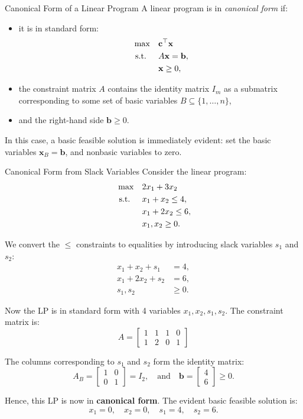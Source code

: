 \begin{definition}{Canonical Form of a Linear Program}\label{def:canonical-form}
A linear program is in \emph{canonical form} if:
\begin{itemize}
    \item it is in standard form:
    \[
    \begin{aligned}
    \max \quad & \mathbf{c}^\top \mathbf{x} \\
    \text{ s.t. } \quad & A \mathbf{x} = \mathbf{b}, \\
    & \mathbf{x} \geq 0,
    \end{aligned}
    \]
    \item the constraint matrix \( A \) contains the identity matrix \( I_m \) as a submatrix corresponding to some set of basic variables \( B \subseteq \{1, \dots, n\} \),
    \item and the right-hand side \( \mathbf{b} \geq 0 \).
\end{itemize}
In this case, a basic feasible solution is immediately evident: set the basic variables \( \mathbf{x}_B = \mathbf{b} \), and nonbasic variables to zero.
\end{definition}

\begin{example}{Canonical Form from Slack Variables}\label{exa:canonical-slack}
Consider the linear program:
\[
\begin{aligned}
\max \quad & 2x_1 + 3x_2 \\
\text{ s.t. } \quad 
& x_1 + x_2 \leq 4, \\
& x_1 + 2x_2 \leq 6, \\
& x_1, x_2 \geq 0.
\end{aligned}
\]

We convert the \( \leq \) constraints to equalities by introducing slack variables \( s_1 \) and \( s_2 \):
\[
\begin{aligned}
x_1 + x_2 + s_1 &= 4, \\
x_1 + 2x_2 + s_2 &= 6, \\
s_1, s_2 &\geq 0.
\end{aligned}
\]

Now the LP is in standard form with 4 variables \( x_1, x_2, s_1, s_2 \). The constraint matrix is:
\[
A = \begin{bmatrix}
1 & 1 & 1 & 0 \\
1 & 2 & 0 & 1
\end{bmatrix}
\]

The columns corresponding to \( s_1 \) and \( s_2 \) form the identity matrix:
\[
A_B = \begin{bmatrix}
1 & 0 \\
0 & 1
\end{bmatrix}
= I_2,
\quad \text{and} \quad
\mathbf{b} = \begin{bmatrix} 4 \\ 6 \end{bmatrix} \geq 0.
\]

Hence, this LP is now in \textbf{canonical form}. The evident basic feasible solution is:
\[
x_1 = 0, \quad x_2 = 0, \quad s_1 = 4, \quad s_2 = 6.
\]
\end{example}

